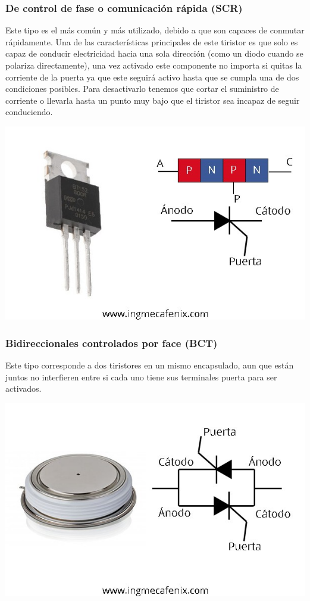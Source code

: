 \documentclass[12pt,a4paper]{article}
\begin{document}
\subsubsection{De control de fase o comunicación rápida (SCR)}
\begin{flushleft}
Este tipo es el más común y más utilizado, debido a que son capaces de conmutar rápidamente. Una de las características principales de este tiristor es que solo es capaz de conducir electricidad hacia una sola dirección (como un diodo cuando se polariza directamente), una vez activado este componente no importa si quitas la corriente de la puerta ya que este seguirá activo hasta que se cumpla una de dos condiciones posibles. Para desactivarlo tenemos que cortar el suministro de corriente o llevarla hasta un punto muy bajo que el tiristor sea incapaz de seguir conduciendo.\linebreak
\begin{center}
\includegraphics[scale=0.5]{imagenes/scr.JPG} 
\end{center}
\subsubsection{Bidireccionales controlados por face (BCT)}
Este tipo corresponde a dos tiristores en un mismo encapsulado, aun que están juntos no interfieren entre si cada uno tiene sus terminales puerta para ser activados. \linebreak
\begin{center}
\includegraphics[scale=0.5]{imagenes/btc.JPG} 
\end{center}
\newpage

\end{flushleft}
\end{document}
